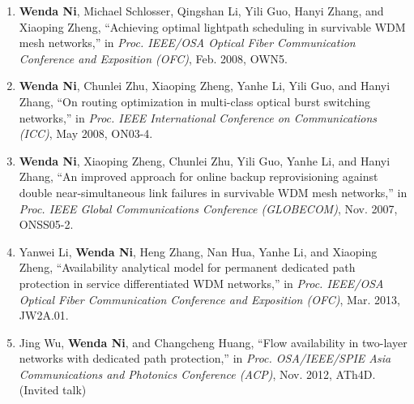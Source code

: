 \documentclass[letterpaper,11pt]{article}
\begin{document}
\begin{enumerate}
\item
\textbf{Wenda Ni}, Michael Schlosser, Qingshan Li, Yili Guo, Hanyi Zhang, and Xiaoping Zheng, ``Achieving optimal lightpath scheduling in survivable WDM mesh networks,'' in \textit{Proc. IEEE/OSA Optical Fiber Communication Conference and Exposition (OFC)}, Feb. 2008, OWN5.

\item
\textbf{Wenda Ni}, Chunlei Zhu, Xiaoping Zheng, Yanhe Li, Yili Guo, and Hanyi Zhang, ``On routing optimization in multi-class optical burst switching networks,'' in \textit{Proc. IEEE International Conference on Communications (ICC)}, May 2008, ON03-4.

\item
\textbf{Wenda Ni}, Xiaoping Zheng, Chunlei Zhu, Yili Guo, Yanhe Li, and Hanyi Zhang, ``An improved approach for online backup reprovisioning against double near-simultaneous link failures in survivable WDM mesh networks,'' in \textit{Proc. IEEE Global Communications Conference (GLOBECOM)}, Nov. 2007, ONSS05-2.

\item
Yanwei Li, \textbf{Wenda Ni}, Heng Zhang, Nan Hua, Yanhe Li, and Xiaoping Zheng, ``Availability analytical model for permanent dedicated path protection in service differentiated WDM networks,'' in \textit{Proc. IEEE/OSA Optical Fiber Communication Conference and Exposition (OFC)}, Mar. 2013, JW2A.01.

\item
Jing Wu, \textbf{Wenda Ni}, and Changcheng Huang, ``Flow availability in two-layer networks with dedicated path protection,'' in \textit{Proc. OSA/IEEE/SPIE Asia Communications and Photonics Conference (ACP)}, Nov. 2012, ATh4D. (Invited talk)


\end{enumerate}
\end{document}
